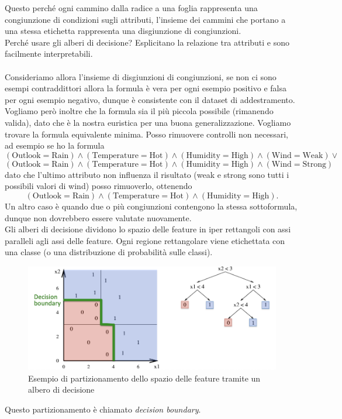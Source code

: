 Questo perché ogni cammino dalla radice a una foglia rappresenta una congiunzione di condizioni sugli attributi, l'insieme dei cammini che portano a una stessa etichetta rappresenta una disgiunzione di congiunzioni.
\\
Perché usare gli alberi di decisione?
Esplicitano la relazione tra attributi e sono facilmente interpretabili.
\\ \\
Consideriamo allora l'insieme di disgiunzioni di congiunzioni, se non ci sono esempi contraddittori allora la formula è vera per ogni esempio positivo e falsa per ogni esempio negativo,
dunque è consistente con il dataset di addestramento.
Vogliamo però inoltre che la formula sia il più piccola possibile (rimanendo valida), dato che è la nostra euristica per una buona generalizzazione.
Vogliamo trovare la formula equivalente minima.
Posso rimuovere controlli non necessari, ad esempio se ho la formula
\[
(\mathrm{Outlook}=\mathrm{Rain}) \land (\mathrm{Temperature}=\mathrm{Hot}) \land (\mathrm{Humidity}=\mathrm{High}) \land (\mathrm{Wind}=\mathrm{Weak}) \lor
\]
\[
(\mathrm{Outlook}=\mathrm{Rain}) \land (\mathrm{Temperature}=\mathrm{Hot}) \land (\mathrm{Humidity}=\mathrm{High}) \land (\mathrm{Wind}=\mathrm{Strong})
\]
dato che l'ultimo attributo non influenza il risultato (weak e strong sono tutti i possibili valori di wind) posso rimuoverlo, ottenendo
\[
(\mathrm{Outlook}=\mathrm{Rain}) \land (\mathrm{Temperature}=\mathrm{Hot}) \land (\mathrm{Humidity}=\mathrm{High}).
\]
Un altro caso è quando due o più congiunzioni contengono la stessa sottoformula, dunque non dovrebbero essere valutate nuovamente.
\\
Gli alberi di decisione dividono lo spazio delle feature in iper rettangoli con assi paralleli agli assi delle feature.
Ogni regione rettangolare viene etichettata con una classe (o una distribuzione di probabilità sulle classi).
\begin{figure}[h]
	\centering
	\includegraphics[width=\textwidth]{pictures/decisionBoundary.png}
	\caption{Esempio di partizionamento dello spazio delle feature tramite un albero di decisione}
\end{figure}
Questo partizionamento è chiamato \textit{decision boundary}.